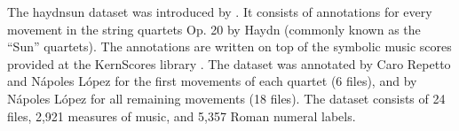 

The \gls{haydnsun} dataset was introduced by
\textcite{napoleslopez2017automatic}. It consists of
annotations for every movement in the string quartets Op. 20
by Haydn (commonly known as the ``Sun'' quartets). The
annotations are written on top of the symbolic music scores
provided at the KernScores library
\parencite{sapp2005online}. The dataset was annotated by
Caro Repetto and N\'apoles L\'opez for the first movements
of each quartet (6 files), and by N\'apoles L\'opez for all
remaining movements (18 files). The dataset consists of 24
files, 2,921 measures of music, and 5,357 Roman numeral
labels. 
